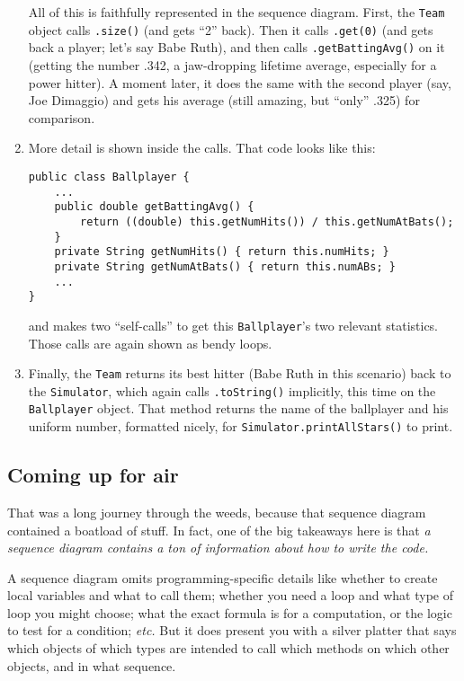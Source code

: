 \begin{enumerate}
All of this is faithfully represented in the sequence diagram. First, the
\texttt{Team} object calls \texttt{.size()} (and gets ``2'' back). Then it
calls \texttt{.get(0)} (and gets back a player; let's say Babe Ruth), and then
calls \texttt{.getBattingAvg()} on it (getting the number .342, a jaw-dropping
lifetime average, especially for a power hitter). A moment later, it does the
same with the second player (say, Joe Dimaggio) and gets his average (still
amazing, but ``only'' .325) for comparison.

\item More detail is shown inside the  calls.
That code looks like this:

\begin{Verbatim}[fontsize=\scriptsize,samepage=true,frame=single]
public class Ballplayer {
    ...
    public double getBattingAvg() {
        return ((double) this.getNumHits()) / this.getNumAtBats();
    }
    private String getNumHits() { return this.numHits; }
    private String getNumAtBats() { return this.numABs; }
    ...
}
\end{Verbatim}

and makes two ``self-calls'' to get this \texttt{Ballplayer}'s two relevant
statistics. Those calls are again shown as bendy loops.

\item Finally, the \texttt{Team} returns its best hitter (Babe Ruth in this
scenario) back to the \texttt{Simulator}, which again calls
\texttt{.toString()} implicitly, this time on the \texttt{Ballplayer} object.
That method returns the name of the ballplayer and his uniform number,
formatted nicely, for \texttt{Simulator.printAllStars()} to print.

\end{enumerate}

\subsection{Coming up for air}

That was a long journey through the weeds, because that sequence diagram
contained a boatload of stuff. In fact, one of the big takeaways here is that
\textit{a sequence diagram contains a ton of information about how to write
the code.}

A sequence diagram omits programming-specific details like whether to create
local variables and what to call them; whether you need a loop and what type
of loop you might choose; what the exact formula is for a computation, or the
logic to test for a condition; \textit{etc.} But it does present you with a
silver platter that says which objects of which types are intended to call
which methods on which other objects, and in what sequence.

